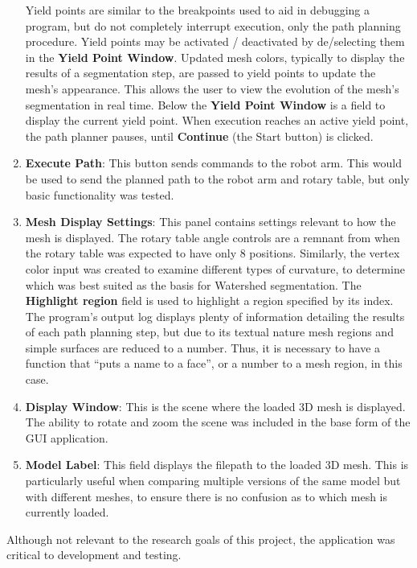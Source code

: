 \begin{enumerate}
		Yield points are similar to the breakpoints used to aid in debugging a program, but do not completely interrupt execution, only the path planning procedure.
		Yield points may be activated / deactivated by de/selecting them in the \textbf{Yield Point Window}.
		Updated mesh colors, typically to display the results of a segmentation step, are passed to yield points to update the mesh's appearance.
		This allows the user to view the evolution of the mesh's segmentation in real time.
		Below the \textbf{Yield Point Window} is a field to display the current yield point.
		When execution reaches an active yield point, the path planner pauses, until \textbf{Continue} (the Start button) is clicked.
	\item \textbf{Execute Path}: This button sends commands to the robot arm.
		This would be used to send the planned path to the robot arm and rotary table, but only basic functionality was tested.
	\item \textbf{Mesh Display Settings}: This panel contains settings relevant to how the mesh is displayed.
		The rotary table angle controls are a remnant from when the rotary table was expected to have only 8 positions.
		Similarly, the vertex color input was created to examine different types of curvature, to determine which was best suited as the basis for Watershed segmentation.
		The \textbf{Highlight region} field is used to highlight a region specified by its index.
		The program's output log displays plenty of information detailing the results of each path planning step, but due to its textual nature mesh regions and simple surfaces are reduced to a number.
		Thus, it is necessary to have a function that ``puts a name to a face'', or a number to a mesh region, in this case.
	\item \textbf{Display Window}: This is the scene where the loaded 3D mesh is displayed.
		The ability to rotate and zoom the scene was included in the base form of the GUI application.
	\item \textbf{Model Label}: This field displays the filepath to the loaded 3D mesh.
		This is particularly useful when comparing multiple versions of the same model but with different meshes, to ensure there is no confusion as to which mesh is currently loaded.
\end{enumerate}

Although not relevant to the research goals of this project, the application was critical to development and testing.


